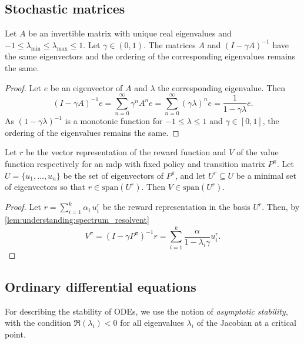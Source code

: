 \subsection{Stochastic matrices}
\begin{lemma}\label{lem:understanding:spectrum_resolvent}
    Let $A$ be an invertible matrix with unique real eigenvalues and $-1 \leq \lambda_{\min} \leq \lambda_{\max} \leq 1 $. Let $\gamma\in(0,1)$.
    The matrices $A$ and $(I - \gamma A)^{-1}$ have the same eigenvectors and the ordering of the corresponding eigenvalues remains the same.
\end{lemma}

\begin{proof}
    Let $e$ be an eigenvector of $A$ and $\lambda$ the corresponding eigenvalue. Then $$(I - \gamma A)^{-1}e = \sum_{n=0}^\infty \gamma^n A^ne = \sum_{n=0}^\infty (\gamma\lambda)^n e = \frac{1}{1 - \gamma\lambda}e.$$ As $(1-\gamma\lambda)^{-1}$ is a monotonic function for $-1 \leq \lambda \leq 1$ and $\gamma\in[0,1]$, the ordering of the eigenvalues remains the same.
\end{proof}

\begin{lemma}\label{lem:understanding:spectrum_rew_value}
    Let $r$ be the vector representation of the reward function and $V$ of the value function respectively for an \ac{mdp}   with fixed policy and transition matrix $P^\pi$.
    Let $U = \{u_1,\dots,u_n\}$ be the set of eigenvectors of $P^\pi$, and let $U^r \subseteq U$ be a minimal set of eigenvectors so that $r \in \mathrm{span}(U^r)$.
    Then $V \in \mathrm{span}(U^r)$.
\end{lemma}
\begin{proof}
    Let $r = \sum_{i=1}^k \alpha_i\, u^r_i$ be the reward representation in the basis $U^r$. Then, by \autoref{lem:understanding:spectrum_resolvent} $$V^\pi = (I - \gamma P^\pi)^{-1} r = \sum_{i=1}^k \frac{\alpha}{1 - \lambda_i\gamma}  u^r_i.$$
\end{proof}


\subsection{Ordinary differential equations}

For describing the stability of ODEs, we use the notion of \emph{asymptotic stability}, with the condition $\Re(\lambda_i) < 0$ for all eigenvalues $\lambda_i$ of the Jacobian at a critical point.


